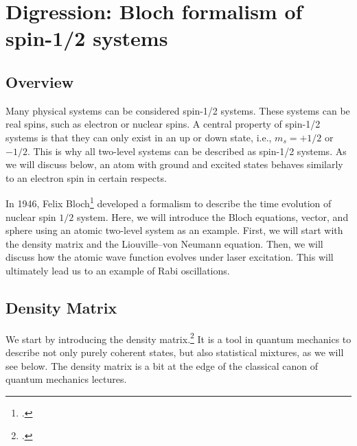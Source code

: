 \renewcommand{\chapterauthors}{Markus Lippitz}
\renewcommand{\lastmod}{January 9, 20256}


\chapter{Digression: Bloch formalism of spin-1/2 systems}




\section{Overview}


Many physical systems can be considered spin-1/2 systems. These systems can be real spins, such as electron or nuclear spins. A central property of spin-1/2 systems is that they can only exist in an up or down state, i.e., $m_s = +1/2$ or $-1/2$. This is why all two-level systems can be described as spin-1/2 systems. As we will discuss below, an atom with ground and excited states behaves similarly to an electron spin in certain respects.


In 1946, Felix Bloch\footcite{Bloch46} developed a formalism to describe the time evolution of nuclear spin $1/2$ system. Here, we will introduce the Bloch equations, vector, and sphere using an atomic two-level system as an example. First, we will start with the density matrix and the Liouville--von Neumann equation. Then, we will discuss how the atomic wave function evolves under laser excitation. This will ultimately lead us to an example of Rabi oscillations.

\section{Density Matrix}


We start by introducing the density matrix.\footcite{Rand2016,Parson,Hamm-dummies,Nolting-QM}
It is a tool in quantum mechanics to describe not only purely coherent states, but also statistical mixtures, as we will see below. The density matrix is a bit at the edge of the classical canon of quantum mechanics lectures.

